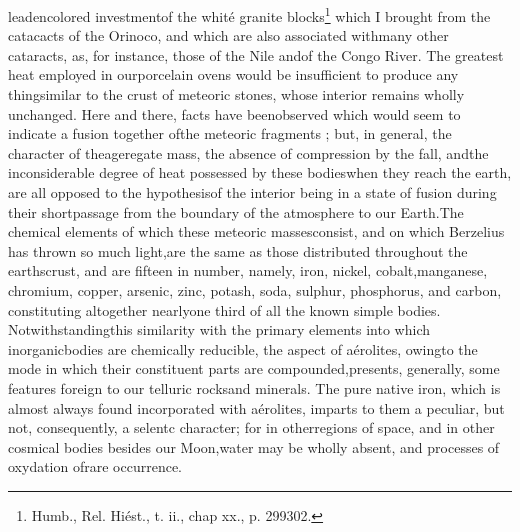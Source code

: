 leadencolored investmentof the whit\'{e} granite blocks\footnote{Humb., Rel. Hi\'{e}st., t. ii., chap xx., p. 299302.} which I brought from the catacacts of the Orinoco, and which are also associated withmany other cataracts, as, for instance, those of the Nile andof the Congo River. The greatest heat employed in ourporcelain ovens would be insufficient to produce any thingsimilar to the crust of meteoric stones, whose interior remains wholly unchanged. Here and there, facts have beenobserved which would seem to indicate a fusion together ofthe meteoric fragments ; but, in general, the character of theageregate mass, the absence of compression by the fall, andthe inconsiderable degree of heat possessed by these bodieswhen they reach the earth, are all opposed to the hypothesisof the interior being in a state of fusion during their shortpassage from the boundary of the atmosphere to our Earth.The chemical elements of which these meteoric massesconsist, and on which Berzelius has thrown so much light,are the same as those distributed throughout the earthscrust, and are fifteen in number, namely, iron, nickel, cobalt,manganese, chromium, copper, arsenic, zinc, potash, soda, sulphur, phosphorus, and carbon, constituting altogether nearlyone third of all the known simple bodies. Notwithstandingthis similarity with the primary elements into which inorganicbodies are chemically reducible, the aspect of a\'{e}rolites, owingto the mode in which their constituent parts are compounded,presents, generally, some features foreign to our telluric rocksand minerals. The pure native iron, which is almost always found incorporated with a\'{e}rolites, imparts to them a peculiar, but not, consequently, a selentc character; for in otherregions of space, and in other cosmical bodies besides our Moon,water may be wholly absent, and processes of oxydation ofrare occurrence.

